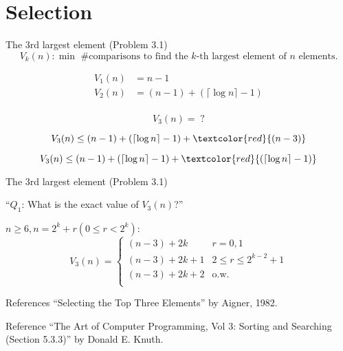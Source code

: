\section{Selection}

\begin{frame}{The $3$rd largest element (Problem 3.1)}
  \[
	V_k(n): \text{$\min$ \#comparisons to find the $k$-th largest element of $n$ elements.}
  \]

  \pause
  \begin{align*}
	V_1(n) &= n - 1 \\
	V_2(n) &= (n - 1) + (\lceil \log n \rceil - 1) \\
  \end{align*}

  \pause
  \[
	V_3(n) = \;?
  \]

  \pause
  \[
	V_3(n) \le (n - 1) + (\lceil \log n \rceil - 1) + \textcolor{red}{(n - 3)}
  \]

  \pause
  \[
	V_3(n) \le (n - 1) + (\lceil \log n \rceil - 1) + \textcolor{red}{(\lceil \log n \rceil - 1)} 
  \]
\end{frame}
\begin{frame}{The $3$rd largest element (Problem 3.1)}
  \centerline{``$Q_1$: What is the exact value of $V_3(n)$?''}

  \begin{theorem}[$V_3(n)$]
	$n \ge 6, n = 2^k + r (0 \le r < 2^k)$:
	\begin{equation*}
	  V_3(n) = \begin{cases}
		(n - 3) + 2 k 	  & r = 0, 1 \\
		(n - 3) + 2 k + 1 & 2 \le r \le 2^{k -2} + 1 \\
		(n - 3) + 2 k + 2 & \text{o.w.} \\
	  \end{cases}
	\end{equation*}
  \end{theorem}

  \begin{alertblock}{References}
	``Selecting the Top Three Elements'' by Aigner, 1982.
  \end{alertblock}

  \pause
  \begin{alertblock}{Reference}
	``The Art of Computer Programming, Vol 3: Sorting and Searching (Section 5.3.3)'' by Donald E. Knuth.
  \end{alertblock}
\end{frame}
